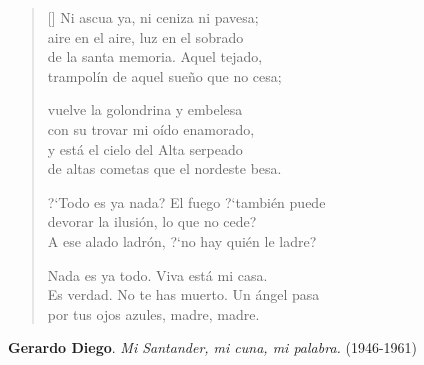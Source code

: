 \begin{verse}[\versewidth]
Ni ascua ya, ni ceniza ni pavesa; \\
aire en el aire, luz en el sobrado \\
de la santa memoria. Aquel tejado, \\
trampolín de aquel sueño que no cesa;

vuelve la golondrina y embelesa \\
con su trovar mi oído enamorado, \\
y está el cielo del Alta serpeado \\
de altas cometas que el nordeste besa.

?`Todo es ya nada? El fuego ?`también puede \\
devorar la ilusión, lo que no cede? \\
A ese alado ladrón, ?`no hay quién le ladre?

Nada es ya todo. Viva está mi casa. \\
Es verdad. No te has muerto. Un ángel pasa \\
por tus ojos azules, madre, madre.
\end{verse}

\bigskip \bigskip

\hspace*{15mm} {\bf Gerardo Diego}. {\em Mi Santander, mi cuna, mi palabra.} (1946-1961)
